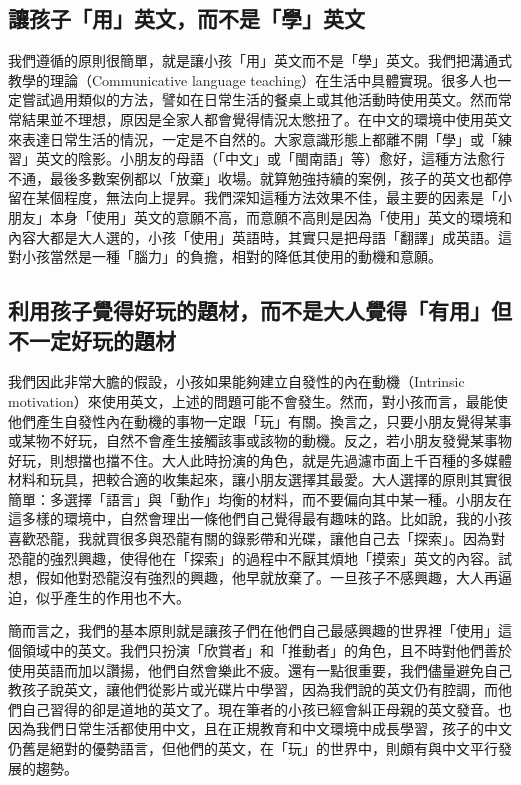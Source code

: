 \subsection{讓孩子「用」英文，而不是「學」英文}
我們遵循的原則很簡單，就是讓小孩「用」英文而不是「學」英文。我們把溝通式教學的理論（Communicative language teaching）在生活中具體實現。很多人也一定嘗試過用類似的方法，譬如在日常生活的餐桌上或其他活動時使用英文。然而常常結果並不理想，原因是全家人都會覺得情況太憋扭了。在中文的環境中使用英文來表達日常生活的情況，一定是不自然的。大家意識形態上都離不開「學」或「練習」英文的陰影。小朋友的母語（「中文」或「閩南語」等）愈好，這種方法愈行不通，最後多數案例都以「放棄」收場。就算勉強持續的案例，孩子的英文也都停留在某個程度，無法向上提昇。我們深知這種方法效果不佳，最主要的因素是「小朋友」本身「使用」英文的意願不高，而意願不高則是因為「使用」英文的環境和內容大都是大人選的，小孩「使用」英語時，其實只是把母語「翻譯」成英語。這對小孩當然是一種「腦力」的負擔，相對的降低其使用的動機和意願。

\subsection{利用孩子覺得好玩的題材，而不是大人覺得「有用」但不一定好玩的題材}
我們因此非常大膽的假設，小孩如果能夠建立自發性的內在動機（Intrinsic motivation）來使用英文，上述的問題可能不會發生。然而，對小孩而言，最能使他們產生自發性內在動機的事物一定跟「玩」有關。換言之，只要小朋友覺得某事或某物不好玩，自然不會產生接觸該事或該物的動機。反之，若小朋友發覺某事物好玩，則想擋也擋不住。大人此時扮演的角色，就是先過濾市面上千百種的多媒體材料和玩具，把較合適的收集起來，讓小朋友選擇其最愛。大人選擇的原則其實很簡單：多選擇「語言」與「動作」均衡的材料，而不要偏向其中某一種。小朋友在這多樣的環境中，自然會理出一條他們自己覺得最有趣味的路。比如說，我的小孩喜歡恐龍，我就買很多與恐龍有關的錄影帶和光碟，讓他自己去「探索」。因為對恐龍的強烈興趣，使得他在「探索」的過程中不厭其煩地「摸索」英文的內容。試想，假如他對恐龍沒有強烈的興趣，他早就放棄了。一旦孩子不感興趣，大人再逼迫，似乎產生的作用也不大。

簡而言之，我們的基本原則就是讓孩子們在他們自己最感興趣的世界裡「使用」這個領域中的英文。我們只扮演「欣賞者」和「推動者」的角色，且不時對他們善於使用英語而加以讚揚，他們自然會樂此不疲。還有一點很重要，我們儘量避免自己教孩子說英文，讓他們從影片或光碟片中學習，因為我們說的英文仍有腔調，而他們自己習得的卻是道地的英文了。現在筆者的小孩已經會糾正母親的英文發音。也因為我們日常生活都使用中文，且在正規教育和中文環境中成長學習，孩子的中文仍舊是絕對的優勢語言，但他們的英文，在「玩」的世界中，則頗有與中文平行發展的趨勢。

